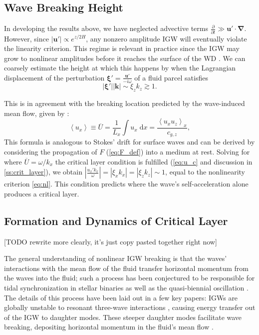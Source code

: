 \documentclass[
        fleqn,
        usenatbib,
    ]{mnras}
\newcommand*{\pd}[2]{\frac{\partial#1}{\partial#2}}
\newcommand*{\abs}[1]{\left|#1\right|}
\newcommand*{\ev}[1]{\left\langle#1\right\rangle}
\newcommand*{\bm}[1]{\boldsymbol{\mathbf{#1}}}
\begin{document}
\subsection{Wave Breaking Height}\label{ss:wave_breaking}

In developing the results above, we have neglected advective terms $\pd{}{t} \gg
\bm{u}' \cdot \bm{\nabla}$. However, since $\abs{\bm{u}'} \propto
e^{z/2H}$, any nonzero amplitude IGW will eventually violate the linearity
criterion. This regime is relevant in practice since the IGW may grow to
nonlinear amplitudes before it reaches the surface of the WD
\citep{fullerI,fullerII}. We can coarsely estimate the height at which this
happens by when the Lagrangian displacement of the perturbation $\bm{\xi}' =
\frac{\bm{u}'}{-i\omega}$ of a fluid parcel satisfies
\begin{equation}
    \abs{\bm{\xi}'} \abs{\bm{k}} \sim \xi_z k_z \gtrsim 1.\label{eq:nl}
\end{equation}

This is in agreement with the breaking location predicted by the wave-induced
mean flow, given by \citep{eliassen_palm_cite,sutherland0}:
\begin{equation}
     \ev{u_{x}} \equiv \overline{U} = \frac{1}{L_x}
        \int\limits u_{x}\;\mathrm{d}x = \frac{\ev{u_{x}u_{z}}_x}{c_{g,z}},
        \label{eq:mean_flow}
\end{equation}
This formula is analogous to Stokes' drift for surface waves and can be derived
by considering the propagation of $F$ (\autoref{eq:F_def}) into a medium at
rest. Solving for where $\overline{U} = \omega / k_x$ the critical layer
condition is fulfilled (\autoref{eq:u_c} and discussion in
\autoref{ss:crit_layer}), we obtain $\abs{\frac{u_{x}'k_{x}}{\omega}} =
\abs{\xi_x k_{x}} = \abs{\xi_z k_z} \sim 1$, equal to the nonlinearity criterion
\autoref{eq:nl}. This condition predicts where the wave's self-acceleration
alone produces a critical layer.

\subsection{Formation and Dynamics of Critical Layer}\label{ss:crit_layer}

[TODO rewrite more clearly, it's just copy pasted together right now]

The general understanding of nonlinear IGW breaking is that the waves'
interactions with the mean flow of the fluid transfer horizontal momentum from
the waves into the fluid; such a process has been conjectured to be responsible
for tidal synchronization in stellar binaries \citep{zahn75,gn89} as well as the
quasi-biennial oscillation \citep{lindzen_qbo}. The details of this process have
been laid out in a few key papers: IGWs are globally unstable to resonant
three-wave interactions \citep{drazin}, causing energy transfer out of the IGW
to daughter modes. These steeper daughter modes facilitate wave breaking,
depositing horizontal momentum in the fluid's mean flow \citep{klostermeyer}.
\end{document}
